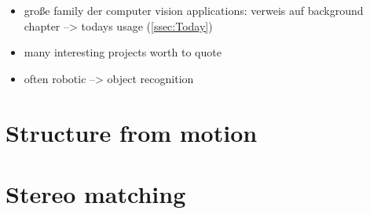 
\begin{itemize}
\item große family der computer vision applications: verweis auf background chapter --> todays usage (\autoref{ssec:Today})
\item many interesting projects worth to quote
\item often robotic --> object recognition
\end{itemize}

\section{Structure from motion}
\section{Stereo matching}


